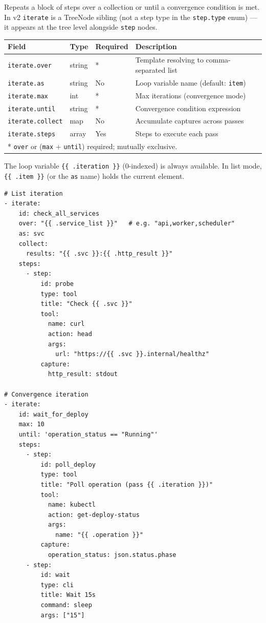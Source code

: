 Repeats a block of steps over a collection or until a convergence condition
is met.  In v2 \texttt{iterate} is a TreeNode sibling (not a step type in the
\texttt{step.type} enum) — it appears at the tree level alongside \texttt{step}
nodes.

\begin{center}
\begin{tabular}{lllp{5cm}}
\hline
\textbf{Field} & \textbf{Type} & \textbf{Required} & \textbf{Description} \\
\hline
\texttt{iterate.over}  & string & * & Template resolving to comma-separated list \\
\texttt{iterate.as}    & string & No & Loop variable name (default: \texttt{item}) \\
\texttt{iterate.max}   & int    & * & Max iterations (convergence mode) \\
\texttt{iterate.until} & string & * & Convergence condition expression \\
\texttt{iterate.collect} & map  & No & Accumulate captures across passes \\
\texttt{iterate.steps} & array  & Yes & Steps to execute each pass \\
\hline
\multicolumn{4}{l}{* \texttt{over} or (\texttt{max} + \texttt{until}) required; mutually exclusive.} \\
\end{tabular}
\end{center}

The loop variable \texttt{\{\{\ .iteration\ \}\}} (0-indexed) is always available.
In list mode, \texttt{\{\{\ .item\ \}\}} (or the \texttt{as} name) holds the
current element.

\begin{verbatim}
# List iteration
- iterate:
    id: check_all_services
    over: "{{ .service_list }}"   # e.g. "api,worker,scheduler"
    as: svc
    collect:
      results: "{{ .svc }}:{{ .http_result }}"
    steps:
      - step:
          id: probe
          type: tool
          title: "Check {{ .svc }}"
          tool:
            name: curl
            action: head
            args:
              url: "https://{{ .svc }}.internal/healthz"
          capture:
            http_result: stdout

# Convergence iteration
- iterate:
    id: wait_for_deploy
    max: 10
    until: 'operation_status == "Running"'
    steps:
      - step:
          id: poll_deploy
          type: tool
          title: "Poll operation (pass {{ .iteration }})"
          tool:
            name: kubectl
            action: get-deploy-status
            args:
              name: "{{ .operation }}"
          capture:
            operation_status: json.status.phase
      - step:
          id: wait
          type: cli
          title: Wait 15s
          command: sleep
          args: ["15"]
\end{verbatim}

